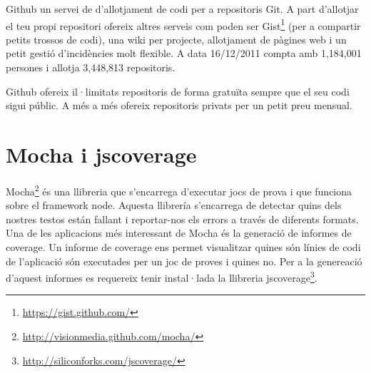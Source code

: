 Github un servei de d'allotjament de codi per a repositoris Git. A part d'allotjar el teu propi repositori ofereix altres serveis com poden ser Gist\footnote{\url{https://gist.github.com/}} (per a compartir petits trossos de codi), una wiki per projecte, allotjament de pàgines web i un petit gestió d'incidències molt flexible. A data 16/12/2011 compta amb 1,184,001 persones i allotja 3,448,813 repositoris.

Github ofereix il·limitats repositoris de forma gratuïta sempre que el seu codi sigui públic. A més a més ofereix repositoris privats per un petit preu mensual. 

\section{Mocha i jscoverage}

Mocha\footnote{\url{http://visionmedia.github.com/mocha/}} és una llibreria que s'encarrega d'executar jocs de prova i que funciona sobre el framework node. Aquesta llibrería s'encarrega de detectar quins dels nostres testos están fallant i reportar-nos els errors a través de diferents formats. Una de les aplicacions més interessant de Mocha és la generació de informes de coverage. Un informe de coverage ens permet visualitzar quines són línies de codi de l'aplicació són executades per un joc de proves i quines no. Per a la genereació d'aquest informes es requereix tenir instal·lada la llibreria jscoverage\footnote{\url{http://siliconforks.com/jscoverage/}}. 



